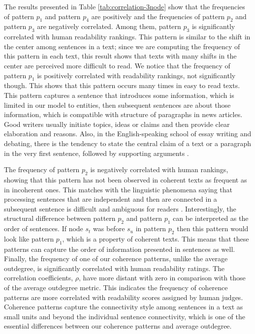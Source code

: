 The results presented in Table \ref{tab:correlation-3node} show that the frequencies of pattern $p_1$ and pattern $p_4$ are positively and the frequencies of pattern $p_2$ and pattern $p_3$ are negatively correlated. 
Among them, pattern $p_3$ is significantly correlated with human readability rankings. 
This pattern is similar to the shift in the center among sentences in a text; since we are computing the frequency of this pattern in each text, this result shows that texts with many shifts in the center are perceived more difficult to read. 
We notice that the frequency of pattern $p_1$ is positively correlated with readability rankings, not significantly though. 
This shows that this pattern occurs many times in easy to read texts.  
This pattern captures a sentence that introduces some information, which is limited in our model to entities, then  subsequent sentences are about those information, which is compatible with structure of paragraphs in news articles. 
Good writers usually initiate topics, ideas or claims and then provide clear elaboration and reasons. 
Also, in the English-speaking school of essay writing and debating, there is the tendency to state the central claim of a text or a paragraph in the very first sentence, followed by supporting arguments \cite{peldszus15}. 

The frequency of pattern $p_2$ is negatively correlated with human rankings, showing that this pattern has not been observed in coherent texts as frequent as in incoherent ones. 
This matches with the linguistic phenomena saying that processing sentences that are independent and then are connected in a subsequent sentence is difficult and ambiguous for readers \cite{danes76}. 
Interestingly, the structural difference between pattern $p_2$ and pattern $p_1$ can be interpreted as the order of sentences. 
If node $s_t$ was before $s_u$ in pattern $p_2$ then this pattern would look like pattern $p_1$, which is a property of coherent texts. 
This means that these patterns can capture the order of information presented in sentences as well. 
Finally, the frequency of one of our coherence patterns, unlike the average outdegree, is significantly correlated with human readability ratings. 
The correlation coefficients, $\rho$, have more distant with zero in comparison with those of the average outdegree metric. 
This indicates the frequency of coherence patterns are more correlated with readability scores assigned by human judges. 
Coherence patterns capture the connectivity style among sentences in a text as small units and beyond the individual  sentence connectivity, which is one of the essential differences between our coherence patterns and average outdegree. 

